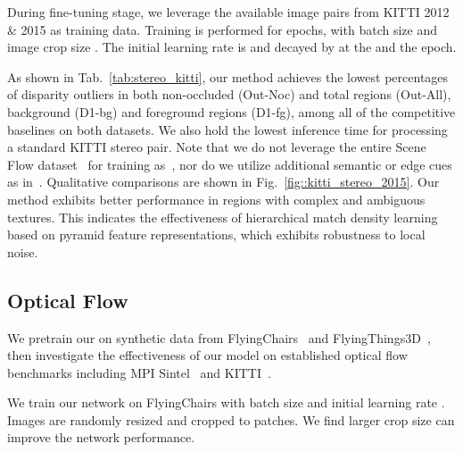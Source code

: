  During fine-tuning stage, we leverage the available  image pairs from KITTI 2012 \& 2015 as training data. 
Training is performed for  epochs, with batch size  and image crop size . 
The initial learning rate is  and decayed by  at the  and the  epoch. 

As shown in Tab.~\ref{tab:stereo_kitti}, our method achieves the lowest percentages of disparity outliers in both non-occluded (Out-Noc) and total regions (Out-All), background (D1-bg) and foreground regions (D1-fg), among all of the competitive baselines on both datasets. 
We also hold the lowest inference time for processing a standard KITTI stereo pair. Note that we do not leverage the entire Scene Flow dataset~\cite{dispnet} for training as~\cite{chang2018pyramid, gcnet}, nor do we utilize additional semantic or edge cues as in~\cite{edgestereo, segstereo}.
Qualitative comparisons are shown in Fig.~\ref{fig::kitti_stereo_2015}. Our method exhibits better performance in regions with complex and ambiguous textures. This indicates the effectiveness of hierarchical match density learning based on pyramid feature representations, which exhibits robustness to local noise. 

\subsection{Optical Flow}
We pretrain our \flowmodelname on synthetic data from FlyingChairs~\cite{dosovitskiy2015flownet} and FlyingThings3D~\cite{ilg2017flownet}, then investigate the effectiveness of our model on established optical flow benchmarks including MPI Sintel~\cite{sintel} and KITTI~\cite{geiger2013vision}.

 We train our network on FlyingChairs with batch size  and initial learning rate . Images are randomly resized and cropped to  patches. We find larger crop size can improve the network performance.

